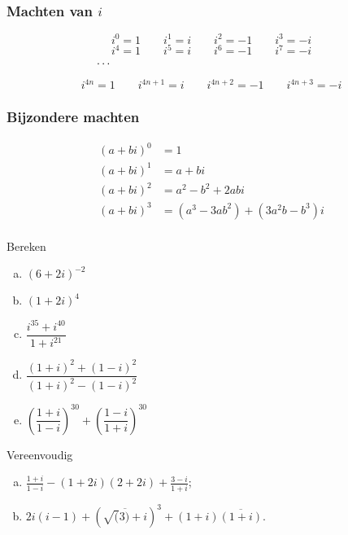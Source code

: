 \documentclass[12pt,twoside,a4paper]{article}
\begin{document}
\subsubsection*{Machten van $i$}
$$i^0=1 \qquad i^1=i \qquad i^2=-1 \qquad i^3=-i$$
$$i^4=1 \qquad i^5=i \qquad i^6=-1 \qquad i^7=-i$$
$$\cdots\hspace*{6.7cm}$$

\begin{center}
\end{center}

$$i^{4n}=1 \qquad i^{4n+1}=i \qquad i^{4n+2}=-1 \qquad i^{4n+3}=-i$$

\subsubsection*{Bijzondere machten}
\begin{align*}
  (a+bi)^0 &= 1\\
  (a+bi)^1 &= a+bi\\
  (a+bi)^2 &= a^2-b^2 + 2abi\\
  (a+bi)^3 &= (a^3 - 3ab^2) + (3a^2b -b^3)i\\
\end{align*}


\begin{oefening}
  Bereken
  \begin{enumerate}[(a)]
    \itemsep1em
  \item $\displaystyle \left(6+2i\right)^{-2}$
  \item $\displaystyle \left(1+2i\right)^4$
  \item $\displaystyle \dfrac{i^{35}+i^{40}}{1+i^{21}}$
  \item $\displaystyle \dfrac{(1+i)^2+(1-i)^2}{(1+i)^2-(1-i)^2}$
  \item $\displaystyle \left(\dfrac{1+i}{1-i}\right)^{30}+\left(\dfrac{1-i}{1+i}\right)^{30}$
  \end{enumerate}
\end{oefening}

\begin{oefening}
  Vereenvoudig
  \begin{enumerate}[(a)]
    \itemsep 1em
  \item $\frac{1+i}{1-i}-(1+2i)(2+2i)+\frac{3-i}{1+i}$;
  \item $2i(i-1)+\left(\overline{\sqrt(3)+i}\right)^3+(1+i)\overline{(1+i)}.$
  \end{enumerate}
\end{oefening}
\end{document}
